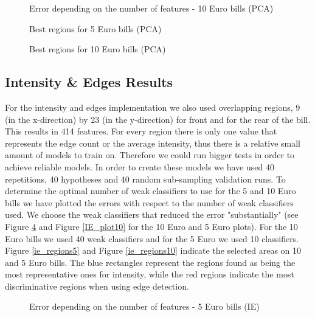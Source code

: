 \documentclass[11pt,twocolumn]{article}
\begin{document}
		\begin{figure}[!hbtp]
			\centering
			\caption{Error depending on the number of features - 10 Euro bills (PCA)}
			\label{pca_plot10}
		\end{figure}

		\begin{figure}[!hbtp]
			\centering
			\caption{Best regions for 5 Euro bills (PCA)}
			\label{pca_regions5}
		\end{figure}
		\begin{figure}[!hbtp]
			\centering
			\caption{Best regions for 10 Euro bills (PCA)}
			\label{pca_regions10}
		\end{figure}
		
		
		\subsection{Intensity \& Edges Results}\label{sec:ie_results}
			For the intensity and edges implementation we also used overlapping regions, 9 (in the x-direction) by 23 (in the y-direction) for front and for the rear of the bill. This results in 414 features. For every region there is only one value that represents the edge count or the average intensity, thus there is a relative small amount of models to train on. Therefore we could run bigger tests in order to achieve reliable models. In order to create these models we have used 40 repetitions, 40 hypotheses and 40 random sub-sampling validation runs. To determine the optimal number of weak classifiers to use for the 5 and 10 Euro bills we have plotted the errors with respect to the number of weak classifiers used. We choose the weak classifiers that reduced the error "substantially" (see Figure \ref{IE_plot5} and Figure \ref{IE_plot10} for the 10 Euro and 5 Euro plots). For the 10 Euro bills we used 40 weak classifiers and for the 5 Euro we used 10 classifiers. Figure \ref{ie_regions5} and Figure \ref{ie_regions10} indicate the selected areas on 10 and 5 Euro bills. The blue rectangles represent the regions found as being the most representative ones for intensity, while the red regions indicate the most discriminative regions when using edge detection.

		\begin{figure}[!hbtp]
			\centering
			\caption{Error depending on the number of features - 5 Euro bills (IE)}
			\label{IE_plot5}
		\end{figure} 
\end{document}
